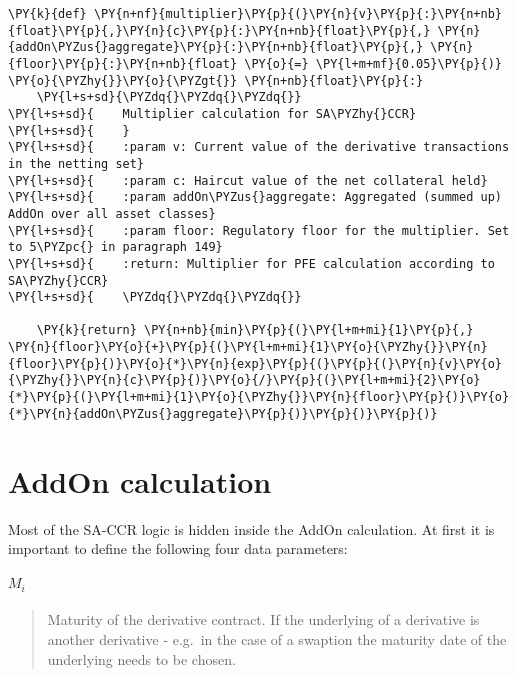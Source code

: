     \begin{tcolorbox}[breakable, size=fbox, boxrule=1pt, pad at break*=1mm,colback=cellbackground, colframe=cellborder]
\begin{Verbatim}[commandchars=\\\{\}]
\PY{k}{def} \PY{n+nf}{multiplier}\PY{p}{(}\PY{n}{v}\PY{p}{:}\PY{n+nb}{float}\PY{p}{,}\PY{n}{c}\PY{p}{:}\PY{n+nb}{float}\PY{p}{,} \PY{n}{addOn\PYZus{}aggregate}\PY{p}{:}\PY{n+nb}{float}\PY{p}{,} \PY{n}{floor}\PY{p}{:}\PY{n+nb}{float} \PY{o}{=} \PY{l+m+mf}{0.05}\PY{p}{)} \PY{o}{\PYZhy{}}\PY{o}{\PYZgt{}} \PY{n+nb}{float}\PY{p}{:}
    \PY{l+s+sd}{\PYZdq{}\PYZdq{}\PYZdq{}}
\PY{l+s+sd}{    Multiplier calculation for SA\PYZhy{}CCR}
\PY{l+s+sd}{    }
\PY{l+s+sd}{    :param v: Current value of the derivative transactions in the netting set}
\PY{l+s+sd}{    :param c: Haircut value of the net collateral held}
\PY{l+s+sd}{    :param addOn\PYZus{}aggregate: Aggregated (summed up) AddOn over all asset classes}
\PY{l+s+sd}{    :param floor: Regulatory floor for the multiplier. Set to 5\PYZpc{} in paragraph 149}
\PY{l+s+sd}{    :return: Multiplier for PFE calculation according to SA\PYZhy{}CCR}
\PY{l+s+sd}{    \PYZdq{}\PYZdq{}\PYZdq{}}
    
    \PY{k}{return} \PY{n+nb}{min}\PY{p}{(}\PY{l+m+mi}{1}\PY{p}{,} \PY{n}{floor}\PY{o}{+}\PY{p}{(}\PY{l+m+mi}{1}\PY{o}{\PYZhy{}}\PY{n}{floor}\PY{p}{)}\PY{o}{*}\PY{n}{exp}\PY{p}{(}\PY{p}{(}\PY{n}{v}\PY{o}{\PYZhy{}}\PY{n}{c}\PY{p}{)}\PY{o}{/}\PY{p}{(}\PY{l+m+mi}{2}\PY{o}{*}\PY{p}{(}\PY{l+m+mi}{1}\PY{o}{\PYZhy{}}\PY{n}{floor}\PY{p}{)}\PY{o}{*}\PY{n}{addOn\PYZus{}aggregate}\PY{p}{)}\PY{p}{)}\PY{p}{)}
\end{Verbatim}
\end{tcolorbox}

    \hypertarget{addon-calculation}{%
\section{AddOn calculation}\label{addon-calculation}}

Most of the SA-CCR logic is hidden inside the AddOn calculation. At
first it is important to define the following four data parameters:

\hypertarget{m_i}{%
\paragraph{\texorpdfstring{\(M_i\)}{M\_i}}\label{m_i}}

\begin{quote}
Maturity of the derivative contract. If the underlying of a derivative
is another derivative - e.g.~in the case of a swaption the maturity date
of the underlying needs to be chosen.
\end{quote}

